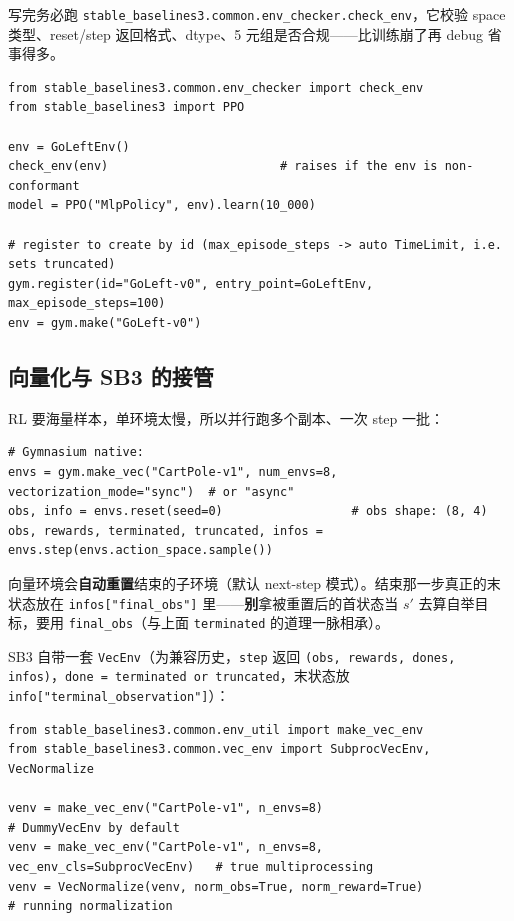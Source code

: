 \documentclass[11pt,a4paper]{article}
\begin{document}
\begin{keybox}[先用 SB3 的检查器验收]
写完务必跑 \texttt{stable\_baselines3.common.env\_checker.check\_env}，它校验 space 类型、reset/step 返回格式、dtype、5 元组是否合规——比训练崩了再 debug 省事得多。
\end{keybox}

\begin{lstlisting}
from stable_baselines3.common.env_checker import check_env
from stable_baselines3 import PPO

env = GoLeftEnv()
check_env(env)                        # raises if the env is non-conformant
model = PPO("MlpPolicy", env).learn(10_000)

# register to create by id (max_episode_steps -> auto TimeLimit, i.e. sets truncated)
gym.register(id="GoLeft-v0", entry_point=GoLeftEnv, max_episode_steps=100)
env = gym.make("GoLeft-v0")
\end{lstlisting}

\subsection{向量化与 SB3 的接管}

RL 要海量样本，单环境太慢，所以并行跑多个副本、一次 step 一批：

\begin{lstlisting}
# Gymnasium native:
envs = gym.make_vec("CartPole-v1", num_envs=8, vectorization_mode="sync")  # or "async"
obs, info = envs.reset(seed=0)                  # obs shape: (8, 4)
obs, rewards, terminated, truncated, infos = envs.step(envs.action_space.sample())
\end{lstlisting}

\begin{keybox}
向量环境会\textbf{自动重置}结束的子环境（默认 next-step 模式）。结束那一步真正的末状态放在 \texttt{infos["final\_obs"]} 里——\textbf{别}拿被重置后的首状态当 $s'$ 去算自举目标，要用 \texttt{final\_obs}（与上面 \texttt{terminated} 的道理一脉相承）。
\end{keybox}

SB3 自带一套 \texttt{VecEnv}（为兼容历史，\texttt{step} 返回 \texttt{(obs, rewards, dones, infos)}，\texttt{done = terminated or truncated}，末状态放 \texttt{info["terminal\_observation"]}）：

\begin{lstlisting}
from stable_baselines3.common.env_util import make_vec_env
from stable_baselines3.common.vec_env import SubprocVecEnv, VecNormalize

venv = make_vec_env("CartPole-v1", n_envs=8)                              # DummyVecEnv by default
venv = make_vec_env("CartPole-v1", n_envs=8, vec_env_cls=SubprocVecEnv)   # true multiprocessing
venv = VecNormalize(venv, norm_obs=True, norm_reward=True)                # running normalization
\end{lstlisting}
\end{document}
